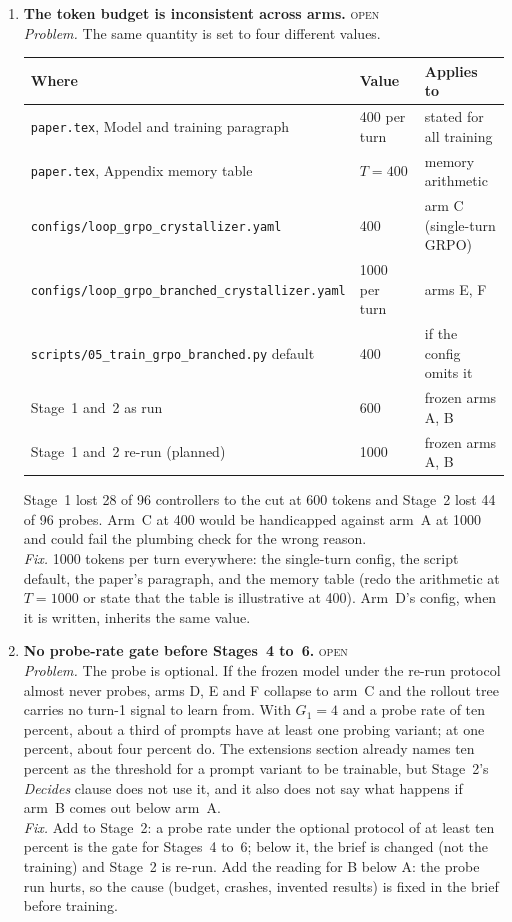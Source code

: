 \documentclass[11pt,a4paper]{article}
\newcommand{\status}[1]{\hfill{\small\textsc{#1}}}
\begin{document}
\begin{enumerate}[leftmargin=1.8em, itemsep=0.8em]
\item \textbf{The token budget is inconsistent across arms.} \status{open}
\label{it:tokens}
\\
\emph{Problem.} The same quantity is set to four different values.
\begin{center}
\small
\begin{tabular}{@{}lll@{}}
\toprule
Where & Value & Applies to \\
\midrule
\texttt{paper.tex}, Model and training paragraph & 400 per turn & stated for all training \\
\texttt{paper.tex}, Appendix memory table & $T=400$ & memory arithmetic \\
\texttt{configs/loop\_grpo\_crystallizer.yaml} & 400 & arm C (single-turn GRPO) \\
\texttt{configs/loop\_grpo\_branched\_crystallizer.yaml} & 1000 per turn & arms E, F \\
\texttt{scripts/05\_train\_grpo\_branched.py} default & 400 & if the config omits it \\
Stage~1 and~2 as run & 600 & frozen arms A, B \\
Stage~1 and~2 re-run (planned) & 1000 & frozen arms A, B \\
\bottomrule
\end{tabular}
\end{center}
Stage~1 lost 28 of 96 controllers to the cut at 600 tokens and Stage~2
lost 44 of 96 probes. Arm~C at 400 would be handicapped against arm~A at
1000 and could fail the plumbing check for the wrong reason.
\\
\emph{Fix.} 1000 tokens per turn everywhere: the single-turn config, the
script default, the paper's paragraph, and the memory table (redo the
arithmetic at $T=1000$ or state that the table is illustrative at 400).
Arm~D's config, when it is written, inherits the same value.

\item \textbf{No probe-rate gate before Stages~4 to~6.} \status{open}
\label{it:probe-gate}
\\
\emph{Problem.} The probe is optional. If the frozen model under the
re-run protocol almost never probes, arms D, E and F collapse to arm~C and
the rollout tree carries no turn-1 signal to learn from. With $G_1=4$ and a
probe rate of ten percent, about a third of prompts have at least one
probing variant; at one percent, about four percent do. The extensions
section already names ten percent as the threshold for a prompt variant
to be trainable, but Stage~2's \emph{Decides} clause does not use it, and
it also does not say what happens if arm~B comes out below arm~A.
\\
\emph{Fix.} Add to Stage~2: a probe rate under the optional protocol of
at least ten percent is the gate for Stages~4 to~6; below it, the brief
is changed (not the training) and Stage~2 is re-run. Add the reading for
B below A: the probe run hurts, so the cause (budget, crashes, invented
results) is fixed in the brief before training.


\end{enumerate}
\end{document}

